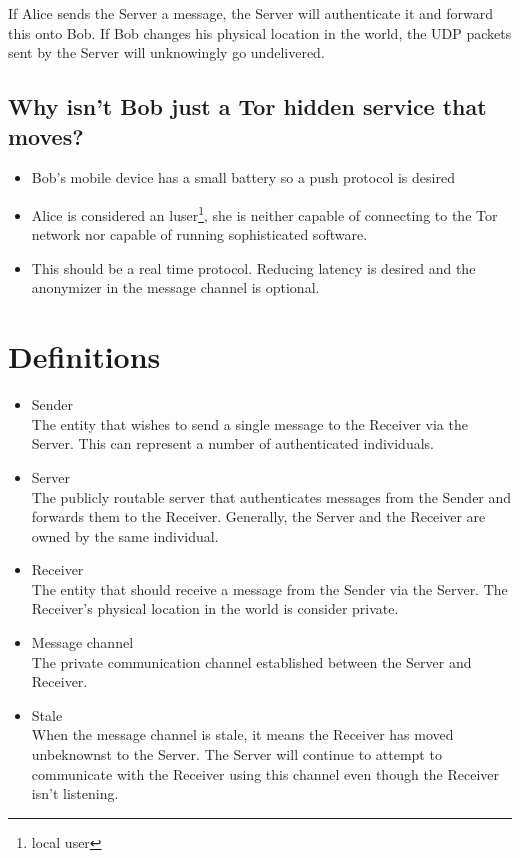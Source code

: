 \documentclass[11pt]{article}
\begin{document}
If Alice sends the Server a message, the Server will authenticate it and
forward this onto Bob. If Bob changes his physical location in the world, the
UDP packets sent by the Server will unknowingly go undelivered.

\subsection*{Why isn't Bob just a Tor hidden service that moves?}
\begin{itemize}
\item Bob's mobile device has a small battery so a push protocol is desired
\item Alice is considered an luser\footnote{local user}, she is neither capable
of connecting to the Tor network nor capable of running sophisticated software.
\item This should be a real time protocol. Reducing latency is desired and the
anonymizer in the message channel is optional.
\end{itemize}

\pagebreak
\section*{Definitions}
\begin{itemize}
\item Sender \\
The entity that wishes to send a single message to the Receiver via the Server.
This can represent a number of authenticated individuals.
\item Server \\
The publicly routable server that authenticates messages from the Sender and
forwards them to the Receiver. Generally, the Server and the Receiver are
owned by the same individual.
\item Receiver \\
The entity that should receive a message from the Sender via the Server. The
Receiver's physical location in the world is consider private.
\item Message channel \\
The private communication channel established between the Server and Receiver.
\item Stale \\
When the message channel is stale, it means the Receiver has moved unbeknownst
to the Server. The Server will continue to attempt to communicate with the
Receiver using this channel even though the Receiver isn't listening.
\end{itemize}
\pagebreak
\end{document}
